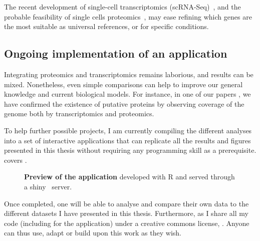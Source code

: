 The recent development of single-cell transcriptomics
(scRNA-Seq)~,
and the probable feasibility of single cells proteomics~,
may ease refining which genes are the most suitable as universal references,
or for specific conditions.


\subsection*{Ongoing implementation of an application}

Integrating proteomics and transcriptomics remains laborious,
and results can be mixed.
Nonetheless,
even simple comparisons %
can help to improve our general knowledge
and current biological models.
For instance, in one of our papers %
,
we have confirmed the existence of putative proteins
by observing coverage of the genome both by transcriptomics and proteomics.

To help further possible projects,
I am currently compiling the different analyses
into a set of interactive applications
that can replicate all the results and figures presented in this thesis
without requiring any programming skill as a prerequisite.
 covers .

\begin{figure}[!ht]
    \centering
    \vspace{-2mm}
    \caption[Application preview]{\label{fig:demoApp}\textbf{Preview of the
    application} developed with \textsf{R}
    and served through a shiny~ server.}
\end{figure}
Once completed, one will be able to analyse and compare their own data
to the different datasets I have presented in this thesis.
Furthermore, as I share all my code (including for the application)
under a creative commons license,
.
Anyone can thus use, adapt or build upon this work as they wish.


